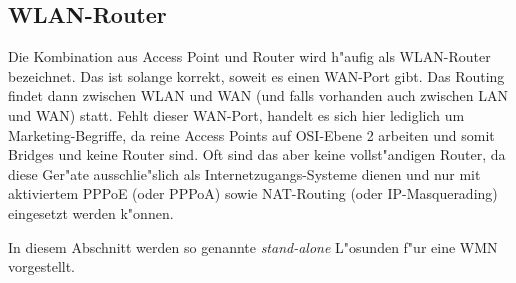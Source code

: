\newpage

\subsection{WLAN-Router}

Die Kombination aus Access Point und Router wird h"aufig als WLAN-Router
bezeichnet. Das ist solange korrekt, soweit es einen WAN-Port gibt. Das
Routing findet dann zwischen WLAN und WAN (und falls vorhanden auch
zwischen LAN und WAN) statt. Fehlt dieser WAN-Port, handelt es sich hier
lediglich um Marketing-Begriffe, da reine Access Points auf OSI-Ebene 2
arbeiten und somit Bridges und keine Router sind. Oft sind das
aber keine vollst"andigen Router, da diese Ger"ate ausschlie"slich als
Internetzugangs-Systeme dienen und nur mit aktiviertem PPPoE (oder PPPoA)
sowie NAT-Routing (oder IP-Masquerading) eingesetzt werden k"onnen.

In diesem Abschnitt werden so genannte \emph{stand-alone} L"osunden f"ur
eine WMN vorgestellt.




